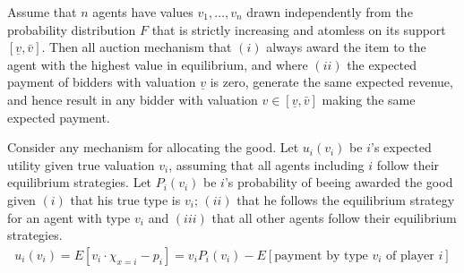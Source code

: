 %
%
%
%

\begin{theorem}
\label{thm:auc:revenue}
Assume that $n$ agents have values $v_1,\dots,v_n$ drawn independently from the probability distribution $F$ that is strictly increasing and atomless on its support $[\underline{v},\bar{v}]$. Then all auction mechanism that $(i)$ always award the item to the agent with the highest value in equilibrium, and where $(ii)$ the expected payment of bidders with valuation $\underline{v}$ is zero, generate the same expected revenue, and hence result in any bidder with valuation $v \in [\underline{v},\bar{v}]$ making the same expected payment.
\end{theorem}

Consider any mechanism for allocating the good. Let $u_i(v_i)$ be $i$'s expected utility given true valuation $v_i$, assuming that all agents including $i$ follow their equilibrium strategies. Let $P_i(v_i)$ be $i$'s probability of beeing awarded the good given $(i)$ that his true type is $v_i$; $(ii)$ that he follows the equilibrium strategy for an agent with type $v_i$ and $(iii)$ that all other agents follow their equilibrium strategies. 
\begin{align}
 u_i(v_i) = E \left[v_i \cdot \chi_{x=i} - p_i \right] = v_i P_i(v_i) - E\left[\text{payment by type $v_i$ of player $i$} \right]  \label{eq:auc:utility2}
\end{align}


